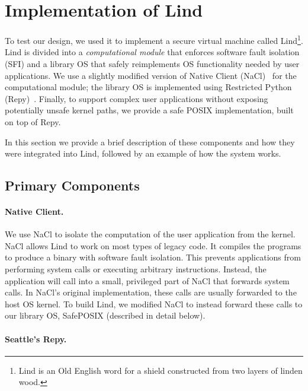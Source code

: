 \section{Implementation of Lind}
\label{sec.implementation}

To test our \lip design, we used it to implement a secure virtual machine
called Lind\footnote{\scriptsize Lind is an Old English word for a shield
constructed from two layers of linden wood.}.  Lind is divided into a
\emph{computational module} that enforces software fault isolation (SFI) and a
library OS that safely reimplements OS functionality needed by user
applications.  We use a slightly modified version of Native Client
(NaCl)~\cite{NaCl-09} for the computational module; the library OS is
implemented using Restricted Python (Repy)~\cite{Repy-10}. Finally, to support
complex user applications without exposing potentially unsafe kernel paths, we
provide a safe POSIX implementation, built on top of Repy.

In this section we provide a brief description of these components and how they
were integrated into Lind, followed by an example of how the system works.

\subsection{Primary Components}

\paragraph{Native Client.}
We use NaCl to isolate the computation of the user application
from the kernel. NaCl allows Lind to work on most types of legacy code.
It compiles the programs to produce a binary with software fault isolation.
This prevents applications from performing system calls
or executing arbitrary instructions.
Instead, the application will call into a small, privileged
part of NaCl that forwards system calls. In NaCl's original implementation,
these calls are usually forwarded to the host OS kernel. To build Lind, we
modified NaCl to instead forward these calls to our library OS, SafePOSIX
(described in detail below).


\paragraph{Seattle's Repy.}

